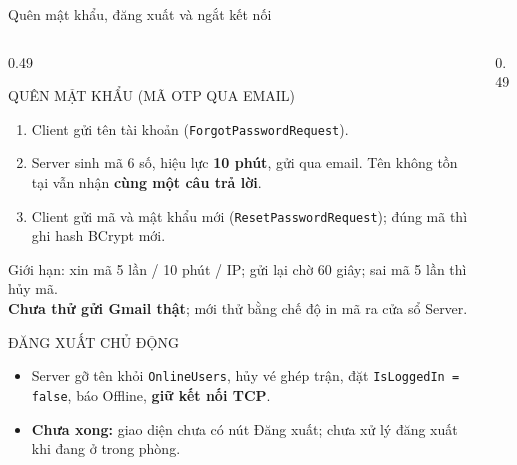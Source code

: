 \documentclass[aspectratio=169,9pt]{beamer}
\newenvironment{haicot}[1]{\begin{columns}[T,onlytextwidth]\begin{column}{#1\textwidth}}{\end{column}\end{columns}}
\newcommand{\sang}[1]{\end{column}\begin{column}{#1\textwidth}}
\begin{document}
\begin{frame}[t,label=account]{Quên mật khẩu, đăng xuất và ngắt kết nối}
  \begin{haicot}{0.49}
    \begin{khung}{QUÊN MẬT KHẨU (MÃ OTP QUA EMAIL)}
      \begin{enumerate}\setlength{\itemsep}{1pt}
        \item Client gửi tên tài khoản (\texttt{ForgotPasswordRequest}).
        \item Server sinh mã 6 số, hiệu lực \textbf{10 phút}, gửi qua email. Tên không tồn tại vẫn nhận \textbf{cùng một câu trả lời}.
        \item Client gửi mã và mật khẩu mới (\texttt{ResetPasswordRequest}); đúng mã thì ghi hash BCrypt mới.
      \end{enumerate}
      Giới hạn: xin mã 5 lần / 10 phút / IP; gửi lại chờ 60 giây; sai mã 5 lần thì hủy mã.\\
      \textbf{Chưa thử gửi Gmail thật}; mới thử bằng chế độ in mã ra cửa sổ Server.
    \end{khung}
    \begin{khung}{ĐĂNG XUẤT CHỦ ĐỘNG}
      \begin{itemize}\setlength{\itemsep}{1pt}
        \item Server gỡ tên khỏi \texttt{OnlineUsers}, hủy vé ghép trận, đặt \texttt{IsLoggedIn = false}, báo Offline, \textbf{giữ kết nối TCP}.
        \item \textbf{Chưa xong:} giao diện chưa có nút Đăng xuất; chưa xử lý đăng xuất khi đang ở trong phòng.
      \end{itemize}
    \end{khung}
  \sang{0.49}
    \centering
\end{haicot}
\end{frame}
\end{document}
